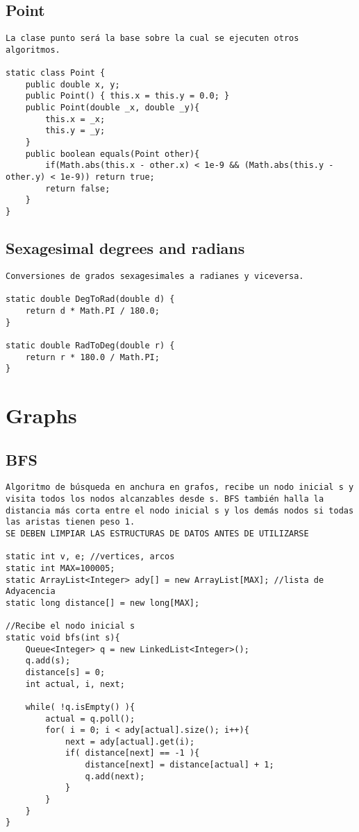 \documentclass[10pt,letterpaper,twocolumn,twosided]{article}
\begin{document}
\subsection{Point}
\begin{lstlisting}
La clase punto será la base sobre la cual se ejecuten otros algoritmos. 

static class Point { 
	public double x, y;
  	public Point() { this.x = this.y = 0.0; }
  	public Point(double _x, double _y){
  		this.x = _x;
  		this.y = _y;
  	} 
  	public boolean equals(Point other){
  		if(Math.abs(this.x - other.x) < 1e-9 && (Math.abs(this.y - other.y) < 1e-9)) return true;
  		return false;
  	}
}
\end{lstlisting}

\subsection{Sexagesimal degrees and radians}
\begin{lstlisting}
Conversiones de grados sexagesimales a radianes y viceversa.

static double DegToRad(double d) { 
	return d * Math.PI / 180.0; 
}

static double RadToDeg(double r) { 
	return r * 180.0 / Math.PI;
}
\end{lstlisting}

\section{Graphs}

\subsection{BFS}
\begin{lstlisting}
Algoritmo de búsqueda en anchura en grafos, recibe un nodo inicial s y visita todos los nodos alcanzables desde s. BFS también halla la distancia más corta entre el nodo inicial s y los demás nodos si todas las aristas tienen peso 1.
SE DEBEN LIMPIAR LAS ESTRUCTURAS DE DATOS ANTES DE UTILIZARSE

static int v, e; //vertices, arcos
static int MAX=100005; 
static ArrayList<Integer> ady[] = new ArrayList[MAX]; //lista de Adyacencia
static long distance[] = new long[MAX];

//Recibe el nodo inicial s
static void bfs(int s){
    Queue<Integer> q = new LinkedList<Integer>();
    q.add(s); 
    distance[s] = 0;
    int actual, i, next;
        
    while( !q.isEmpty() ){
        actual = q.poll();
        for( i = 0; i < ady[actual].size(); i++){
            next = ady[actual].get(i);
            if( distance[next] == -1 ){
                distance[next] = distance[actual] + 1;
                q.add(next);
            }
        }
    }
}\end{lstlisting}
\end{document}
